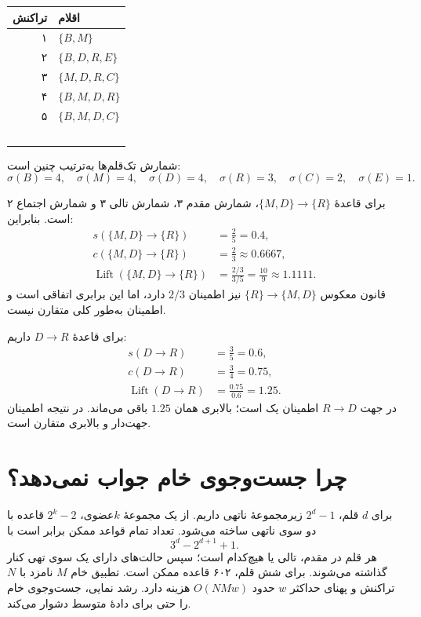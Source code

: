 \documentclass[12pt,a4paper,oneside]{report}
\begin{document}
{\def\LTcaptype{table} %
\begin{longtable}[]{@{}rl@{}}
\toprule\noalign{}
تراکنش & اقلام \\
\midrule\noalign{}
\endhead
\bottomrule\noalign{}
\endlastfoot
۱ & $\{B,M\}$ \\\
۲ & $\{B,D,R,E\}$ \\\
۳ & $\{M,D,R,C\}$ \\\
۴ & $\{B,M,D,R\}$ \\\
۵ & $\{B,M,D,C\}$ \\\
\end{longtable}
}

شمارش تک‌قلم‌ها به‌ترتیب چنین است:
\[\sigma(B)=4,\quad\sigma(M)=4,\quad\sigma(D)=4,\quad\sigma(R)=3,\quad\sigma(C)=2,\quad\sigma(E)=1.\]

برای قاعدهٔ $\{M,D\}\to\{R\}$، شمارش مقدم ۳، شمارش تالی ۳ و شمارش اجتماع ۲ است. بنابراین:
\begin{align*}
s(\{M,D\}\to\{R\})&=\frac25=0.4,\\
c(\{M,D\}\to\{R\})&=\frac23\approx0.6667,\\
\operatorname{Lift}(\{M,D\}\to\{R\})&=\frac{2/3}{3/5}=\frac{10}{9}\approx1.1111.
\end{align*}
قانون معکوس $\{R\}\to\{M,D\}$ نیز اطمینان $2/3$ دارد، اما این برابری اتفاقی است و اطمینان به‌طور کلی متقارن نیست.

برای قاعدهٔ $D\to R$ داریم:
\begin{align*}
s(D\to R)&=\frac35=0.6,\\
c(D\to R)&=\frac34=0.75,\\
\operatorname{Lift}(D\to R)&=\frac{0.75}{0.6}=1.25.
\end{align*}
در جهت $R\to D$ اطمینان یک است؛ بالابری همان $1.25$ باقی می‌ماند. در نتیجه اطمینان جهت‌دار و بالابری متقارن است.

\section{چرا جست‌وجوی خام جواب نمی‌دهد؟}

برای $d$ قلم، $2^d-1$ زیرمجموعهٔ ناتهی داریم. از یک مجموعهٔ $k$عضوی، $2^k-2$ قاعده با دو سوی ناتهی ساخته می‌شود. تعداد تمام قواعد ممکن برابر است با
\[3^d-2^{d+1}+1.\]
هر قلم در مقدم، تالی یا هیچ‌کدام است؛ سپس حالت‌های دارای یک سوی تهی کنار گذاشته می‌شوند. برای شش قلم، ۶۰۲ قاعده ممکن است. تطبیق خام $M$ نامزد با $N$ تراکنش و پهنای حداکثر $w$ حدود $O(NMw)$ هزینه دارد. رشد نمایی، جست‌وجوی خام را حتی برای دادهٔ متوسط دشوار می‌کند.
\end{document}
